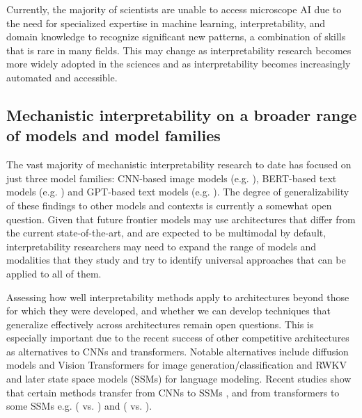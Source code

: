 Currently, the majority of scientists are unable to access microscope AI due to the need for specialized expertise in machine learning, interpretability, and domain knowledge to recognize significant new patterns, a combination of skills that is rare in many fields. This may change as interpretability research becomes more widely adopted in the sciences and as interpretability becomes increasingly automated and accessible.

\subsection{Mechanistic interpretability on a broader range of models and model families}
\label{subsec:broader-range-of-models}

The vast majority of mechanistic interpretability research to date has focused on just three model families: CNN-based image models (e.g. \cite{Erhan_2009_visualising, nguyen2016multifacetedfeaturevisualizationuncovering,olah2020zoom}), BERT-based text models (e.g. \cite{devlin2019bertpretrainingdeepbidirectional, rogers2020primerbertologyknowbert}) 
and GPT-based text models (e.g. \cite{elhage2021mathematical, Wang_2022_Circuits,nanda2023progressmeasuresgrokkingmechanistic}). The degree of generalizability of these findings to other models and contexts is currently a somewhat open question. Given that future frontier models may use architectures that differ from the current state-of-the-art, and are expected to be multimodal by default, interpretability researchers may need to expand the range of models and modalities that they study and try to identify universal approaches that can be applied to all of them.

Assessing how well interpretability methods apply to architectures beyond those for which they were developed, and whether we can develop techniques that generalize effectively across architectures remain open questions. This is especially important due to the recent success of other competitive architectures as alternatives to CNNs and transformers. Notable alternatives include diffusion models \citep{pmlr-v37-sohl-dickstein15, rombach2022highresolutionimagesynthesislatent} and Vision Transformers \citep{dosovitskiy2021imageworth16x16words} for image generation/classification and RWKV \citep{peng2023rwkvreinventingrnnstransformer} and later state space models (SSMs) \citep{gu2024mambalineartimesequencemodeling} for language modeling. Recent studies show that certain methods transfer from CNNs to SSMs  \citep{paulo2024doestransformerinterpretabilitytransfer}, and from transformers to some SSMs e.g. (\citet{meng2022locating} vs. \citet{sharma2024locatingeditingfactualassociations}) and (\citet{Wang_2022_Circuits} vs. \citet{ensign2024investigatingindirectobjectidentification}).


